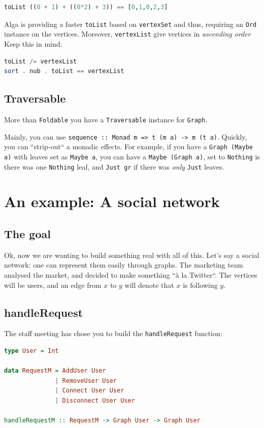\documentclass[10pt,a4paper]{article}
\begin{document}
\begin{lstlisting}[language=Haskell, frame=single]
toList ((0 + 1) + ((0*2) + 3)) == [0,1,0,2,3]
\end{lstlisting}

Alga is providing a faster \verb|toList| based on \verb|vertexSet| and thus, requiring an \verb|Ord| instance on the vertices. Moreover, \verb|vertexList| give vertices in \emph{ascending order}
\\
Keep this in mind:
\begin{lstlisting}[language=Haskell, frame=single]
toList /= vertexList
sort . nub . toList == vertexList
\end{lstlisting}

\subsection{Traversable}
More than \verb|Foldable| you have a \verb|Traversable| instance for \verb|Graph|.

Mainly, you can use \verb|sequence :: Monad m => t (m a) -> m (t a)|. Quickly, you can ``strip-out`` a monadic effects. For example, if you have a \verb|Graph (Maybe a)| with leaves set as \verb|Maybe a|, you can have a \verb|Maybe (Graph a)|, set to \verb|Nothing| is there was one \verb|Nothing| leaf, and \verb|Just gr| if there was \emph{only} \verb|Just| leaves.

\section{An example: A social network}
\subsection{The goal}

Ok, now we are wanting to build something real with all of this. Let's say a social network: one can represent them easily through graphs.
The marketing team analysed the market, and decided to make something ``à la Twitter``. The vertices will be users, and an edge from $x$ to $y$ will denote that $x$ is following $y$.

\subsection{handleRequest}
The staff meeting has chose you to build the \verb|handleRequest| function:
\begin{lstlisting}[language=Haskell, frame=single]
type User = Int

data RequestM = AddUser User
			  | RemoveUser User
			  | Connect User User
			  | Disconnect User User

handleRequestM :: RequestM -> Graph User -> Graph User
\end{lstlisting}
\end{document}
